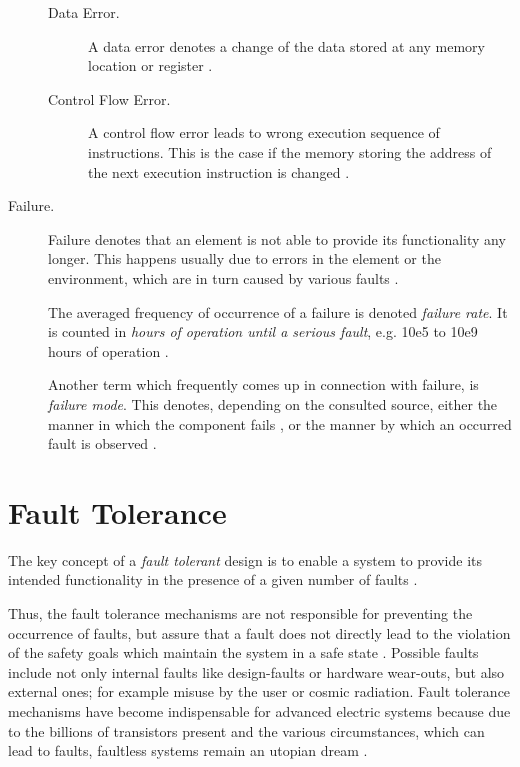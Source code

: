 \begin{description}
\begin{description}
\item [Data Error.]
A data error denotes a change of the data stored at any memory location or register \cite{elattar2007}.

\item [Control Flow Error.]
A control flow error leads to wrong execution sequence of instructions. This is the case if the memory storing the address of the next execution instruction is changed \cite{elattar2007}.
\end{description}

\item [Failure.]
Failure denotes that an element is not able to provide its functionality any longer. This happens usually due to errors in the element or the environment, which are in turn caused by various faults \cite{iso26262:1} \cite{nelson} \cite{autosar_glossary}.

The averaged frequency of occurrence of a failure is denoted \emph{failure rate}. It is counted in \emph{hours of operation until a serious fault}, e.g. 10e5 to 10e9 hours of operation \cite{rodrigues2011}.

Another term which frequently comes up in connection with failure, is \emph{failure mode}. This denotes, depending on the consulted source, either the manner in which the component fails \cite{international2006analysis}, or the manner by which an occurred fault is observed \cite{mil1980}.
\end{description}



\section{Fault Tolerance}
\label{ch:fault_tolerance}

The key concept of a \emph{fault tolerant} design is to enable a system to provide its intended functionality in the presence of a given number of faults \cite{nelson}.

Thus, the fault tolerance mechanisms are not responsible for preventing the occurrence of faults, but assure that a fault does not directly lead to the violation of the safety goals which maintain the system in a safe state \cite{iso26262:1}. Possible faults include not only internal faults like design-faults or hardware wear-outs, but also external ones; for example misuse by the user or cosmic radiation. Fault tolerance mechanisms have become indispensable for advanced electric systems because due to the billions of transistors present and the various circumstances, which can lead to faults, faultless systems remain an utopian dream \cite{genesys}.


